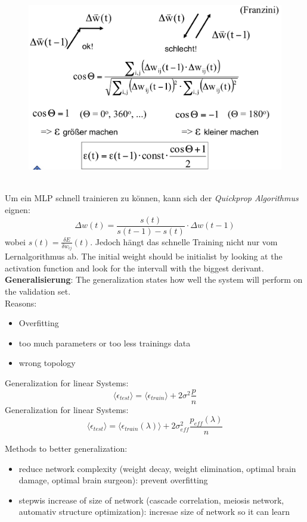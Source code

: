 \begin{figure}[h]
\includegraphics[scale=0.3]{dynamic-learning-rate}
\end{figure}\\[1cm]
Um ein MLP schnell trainieren zu können, kann sich der \textit{Quickprop Algorithmus} eignen:
\[
\Delta w(t) = \frac{s(t)}{s(t - 1) - s(t)} \cdot \Delta w(t-1)
\]
wobei $s(t) = \frac{\delta E}{\delta w_{ij}}(t)$. Jedoch hängt das schnelle Training nicht nur vom Lernalgorithmus ab. The initial weight should be initialist by looking at the activation function and look for the intervall with the biggest derivant.
\textbf{Generalisierung}: The generalization states how well the system will perform on the validation set.\\
Reasons:
\begin{itemize}
	\item Overfitting
	\item too much parameters or too less trainings data
	\item wrong topology
\end{itemize}
Generalization for linear Systems:
\[
\langle \epsilon_{test} \rangle = \langle \epsilon_{train} \rangle + 2 \sigma^2 \frac{p}{n}
\]
Generalization for linear Systems:
\[
\langle \epsilon_{test} \rangle = \langle \epsilon_{train}(\lambda) \rangle + 2 \sigma^2_{eff} \frac{p_{eff}(\lambda)}{n}
\]

Methods to better generalization:
\begin{itemize}
	\item reduce network complexity (weight decay, weight elimination, optimal brain damage, optimal brain surgeon): prevent overfitting
	\item stepwis increase of size of network (cascade correlation, meiosis network, automativ structure optimization): incresae size of network so it can learn
\end{itemize}

